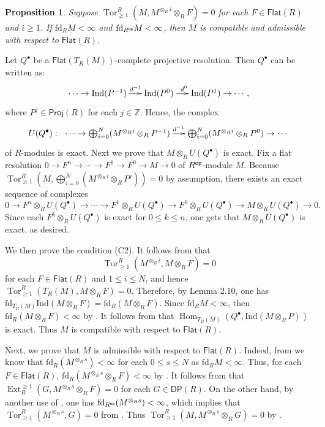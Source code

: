 \documentclass[10pt,twoside]{amsart}
\theoremstyle{bfupright head,slanted body}
\theoremstyle{bfupright head,upright body}
\theoremstyle{fixed bf head,slanted body}
\newtheorem{prp}[res]{Proposition}      \newtheorem*{prp*}{Proposition}
\theoremstyle{fixed bf head,upright body}
\theoremstyle{numbered paragraph}
\newenvironment{prf*}[1][Proof]{%
  \begin{proof}[\bf #1]
    \setcounter{equation}{0}
    \renewcommand{\theequation}{\arabic{equation}}}
  {\end{proof}
}
\numberwithin{equation}{res}
\newcommand{\DP}{\mathsf{DP}}
\newcommand{\Proj}{\mathsf{Proj}}
\newcommand{\fd}{\mathrm{fd}}
\newcommand{\Flat}{\mathsf{Flat}}
\newcommand{\Ind}{\mathrm{Ind}}
\newcommand{\Rop}{R^{\sf op}}
\newcommand{\Hom}{\operatorname{Hom}}
\newcommand{\Ext}{\operatorname{Ext}}
\newcommand{\Tor}{\operatorname{Tor}}
\begin{document}
\begin{prp} \label{example of admissible and compatible}
Suppose $\Tor_{\geqslant 1}^R(M, M^{\otimes_Ri}\otimes_R F)=0$
for each $F\in \Flat(R)$ and $i \geqslant 1$.
If $\fd_RM<\infty$ and $\fd_{\Rop}M<\infty$,
then $M$ is compatible and admissible with respect to $\Flat(R)$.
\end{prp}
\begin{prf*}
Let $Q^\bullet$ be a $\Flat(T_R(M))$-complete projective resolution.
Then $Q^\bullet$ can be written as:
$$\xymatrix@C=0.5cm{
\cdots \to \Ind(P^{-1}) \ar[r]^{\qquad d^{-1}\,\,} & \Ind(P^0)
\ar[r]^{d^0 \quad \,\,} & \Ind(P^1) \to \cdots,}$$
where $P^j \in \Proj(R)$ for each $j \in \mathbb{Z}$. Hence, the complex
$$U(Q^\bullet):\ \xymatrix@C=0.5cm{\cdots \to \bigoplus_{i=0}^N(M^{\otimes_Ri}\otimes_RP^{-1})
\ar[r]^{\,\, d^{-1}} &
\bigoplus_{i=0}^N(M^{\otimes_Ri}\otimes_RP^0) \to \cdots}$$ of $R$-modules is exact.
Next we prove that $M\otimes_R U(Q^\bullet)$ is exact.
Fix a flat resolution
$0 \to F^n \to \cdots \to  F^1 \to  F^0 \to M \to 0$ of $\Rop$-module $M$.
Because $\Tor_{\geqslant 1}^R(M,\bigoplus_{i=0}^N(M^{\otimes_Ri}\otimes_RP^j))=0$
by assumption, there exists an exact sequence of complexes
$$0 \to F^n\otimes_R U(Q^\bullet) \to \cdots \to  F^1\otimes_R U(Q^\bullet) \to
F^0\otimes_R U(Q^\bullet) \to M\otimes_R U(Q^\bullet) \to 0.$$
Since each $F^k\otimes_R U(Q^\bullet)$ is exact for $0\leqslant k\leqslant n$,
one gets that $M\otimes_R U(Q^\bullet)$ is exact, as desired.

We then prove the condition (C2). It follows from \cite[Lemma 2.4]{DL} that
$$\Tor_{\geqslant 1}^R(M^{\otimes_Ri},M\otimes_R F)=0$$
for each $F \in \Flat(R)$ and $1\leqslant i\leqslant N$,
and hence $\Tor_{\geqslant 1}^R(T_R(M),M\otimes_R F)=0$.
Therefore, by Lemma 2.10, one has $\fd_{T_R(M)}\Ind(M\otimes_R F)=\fd_R(M\otimes_R F)$.
Since $\fd_RM<\infty$, then $\fd_R(M\otimes_R F)<\infty$ by \cite[Lemma 3.2(2)]{2022Mao}. 
It follows from \cite[Lemma 3.1]{2022Mao} that $\Hom_{T_R(M)}(Q^\bullet,\Ind(M\otimes_RP))$ is exact.
Thus $M$ is compatible with respect to $\Flat(R)$.

Next, we prove that $M$ is admissible with respect to $\Flat(R)$.
Indeed, from \cite[Lemma 2.5]{DL} we know that $\fd_R(M^{\otimes_Rs})<\infty$ for each $0\leqslant s \leqslant N$ as $\fd_RM<\infty$. Thus, for each $F\in\Flat(R)$, $\fd_R(M^{\otimes_Rs}\otimes_R F)<\infty$ by \cite[Lemma 3.2(2)]{2022Mao}.
It follows from \cite[Lemma 3.1]{2022Mao} that $\Ext_R^{\geqslant 1}(G, M^{\otimes_Rs}\otimes_R F)=0$
for each $G \in \DP(R)$.
On the other hand, by another use of \cite[Lemma 2.5]{DL}, one has $\fd_{\Rop}(M^{\otimes_Rs})<\infty$,
which implies that $\Tor_{\geqslant 1}^R(M^{\otimes_Rs}, G)=0$ from \cite[Lemma 2.3]{EIT}.
Thus $\Tor_{\geqslant 1}^R(M,M^{\otimes_Rs}\otimes_RG)=0$ by \cite[Lemma 2.4]{DL}. 
\end{prf*}
\end{document}
